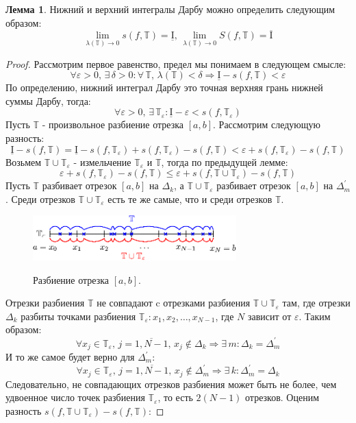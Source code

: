 \documentclass[12pt]{article}
\newcommand{\MTB}{\mathbb{T}}
\newcommand{\MI}{\mathrm{I}}
\newcommand{\VE}{\varepsilon}
\theoremstyle{definition}
\newtheorem{lemma}{Лемма}
\begin{document}
\begin{lemma}
	Нижний и верхний интегралы Дарбу можно определить следующим образом:
	$$
		\lim\limits_{\lambda(\MTB) \to 0}s(f,\MTB)  = \underline{\MI}, \, \lim\limits_{\lambda(\MTB) \to 0}S(f,\MTB)  =\overline{\MI}
	$$
\end{lemma}
\begin{proof}
	Рассмотрим первое равенство, предел мы понимаем в следующем смысле:
	$$
		\forall \VE > 0, \, \exists \, \delta > 0 \colon \forall \, \MTB, \, \lambda(\MTB) < \delta \Rightarrow \underline{\MI} - s(f,\MTB) < \VE
	$$
	По определению, нижний интеграл Дарбу это точная верхняя грань нижней суммы Дарбу, тогда:
	$$
		\forall \VE > 0, \, \exists \, \MTB_\VE \colon \underline{\MI} - \VE < s(f,\MTB_\VE)
	$$
	Пусть $\MTB$ - произвольное разбиение отрезка $[a,b]$. Рассмотрим следующую разность:
	$$
		\underline{\MI} - s(f,\MTB) = \underline{\MI} - s(f,\MTB_\VE) + s(f,\MTB_\VE) - s(f,\MTB) < \VE + s(f,\MTB_\VE) - s(f,\MTB)
	$$
	Возьмем $\MTB \cup \MTB_\VE$ - измельчение $\MTB_\VE$ и $\MTB$, тогда по предыдущей лемме:
	$$
		\VE + s(f,\MTB_\VE) - s(f,\MTB) \leq \VE + s(f,\MTB \cup \MTB_\VE) - s(f,\MTB)
	$$
	Пусть $\MTB$ разбивает отрезок $[a,b]$ на $\Delta_k$, а $\MTB \cup \MTB_\VE$ разбивает отрезок $[a,b]$ на $\Delta_m^\prime$. Среди отрезков $\MTB \cup \MTB_\VE$ есть те же самые, что и среди отрезков $\MTB$.
	\begin{figure}[H]
		\centering
		\includegraphics[width=0.7\textwidth]{24_1.eps}
		\label{24_1}
		\caption{Разбиение отрезка $[a,b]$.}
		\label{fig:Критерий Дарбу}
	\end{figure}
	Отрезки разбиения $\MTB$ не совпадают c отрезками разбиения $\MTB \cup \MTB_\VE$ там, где отрезки $\Delta_k$ разбиты точками разбиения $\MTB_\VE \colon x_1, x_2, \dotsc, x_{N-1}$, где $N$ зависит от $\VE$. Таким образом: 
	$$
		\forall x_j \in \MTB_\VE, \, j = \overline{1,N-1}, \, x_j \notin \Delta_k  \Rightarrow \exists \, m \colon \Delta_k = \Delta_m^\prime
	$$
	И то же самое будет верно для $\Delta_m^\prime$:
	$$
		\forall x_j \in \MTB_\VE, \, j = \overline{1,N-1}, \, x_j \notin \Delta_m^\prime \Rightarrow \exists \, k \colon \Delta_m^\prime = \Delta_k
	$$
	Следовательно, не совпадающих отрезков разбиения может быть не более, чем удвоенное число точек разбиения $\MTB_\VE$, то есть $2(N-1)$ отрезков. Оценим разность $s(f,\MTB \cup \MTB_\VE) - s(f,\MTB)$:

\end{proof}
\end{document}
